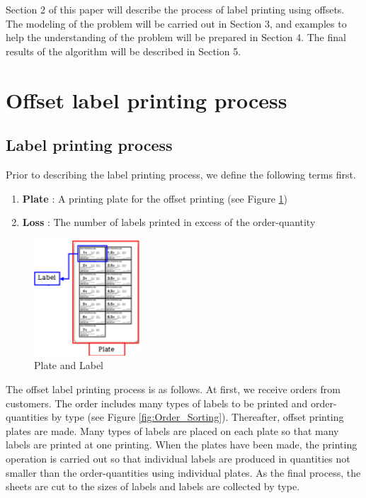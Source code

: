 Section 2 of this paper will describe the process of label printing using offsets. The modeling of the problem will be carried out in Section 3, and examples to help the understanding of the problem will be prepared in Section 4. The final results of the algorithm will be described in Section 5. 


\section{Offset label printing process}\label{sec:Offset}

\subsection{Label printing process}\label{subsec:LabelPrinting}
Prior to describing the label printing process, we define the following terms first.
\begin{enumerate}[*]
	\item {\bf Plate} : A printing plate for the offset printing (see Figure \ref{fig:PlateLabel})
	\item {\bf Loss} : The number of labels printed in excess of the order-quantity
\end{enumerate}

\begin{figure}
	\includegraphics[width=4cm]{PlateLabel.pdf}
	\caption{Plate and Label}
	\label{fig:PlateLabel}       %
\end{figure}

The offset label printing process is as follows. At first, we receive orders from customers. The order includes many types of labels to be printed and order-quantities by type (see Figure \ref{fig:Order_Sorting}). Thereafter, offset printing plates are made. Many types of labels are placed on each plate so that many labels are printed at one printing. When the plates have been made, the printing operation is carried out so that individual labels are produced in quantities not smaller than the order-quantities using individual plates. As the final process, the sheets are cut to the sizes of labels and labels are collected by type.

